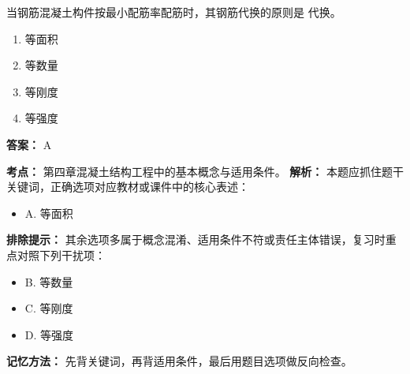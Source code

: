 \documentclass[UTF8,fontset=fandol,11pt]{ctexart}
\begin{document}
\vspace{0.2em}

\begin{quizbox}[title={第 14 题}]
当钢筋混凝土构件按最小配筋率配筋时，其钢筋代换的原则是 代换。\\
\begin{enumerate}[label=\Alph*.]
\item 等面积
\item 等数量
\item 等刚度
\item 等强度
\end{enumerate}
\textbf{答案：} A
\vspace{0.25em}
\begin{answerbox}[title={考点解析}]
\textbf{考点：} 第四章混凝土结构工程中的基本概念与适用条件。
\textbf{解析：} 本题应抓住题干关键词，正确选项对应教材或课件中的核心表述：
\begin{itemize}
\item A. 等面积
\end{itemize}
\textbf{排除提示：} 其余选项多属于概念混淆、适用条件不符或责任主体错误，复习时重点对照下列干扰项：
\begin{itemize}
\item B. 等数量
\item C. 等刚度
\item D. 等强度
\end{itemize}
\textbf{记忆方法：} 先背关键词，再背适用条件，最后用题目选项做反向检查。
\end{answerbox}
\end{quizbox}

\vspace{0.2em}
\end{document}

